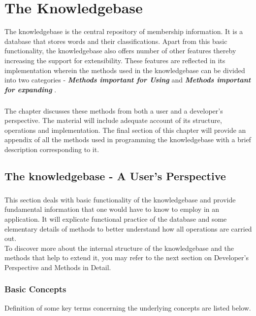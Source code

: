 \chapter{The Knowledgebase}

The knowledgebase is the central repository of membership information. It is a database that stores words and their classifications. Apart from this basic functionality, the knowledgebase also offers number of other features thereby increasing the support for extensibility.
These features are reflected in its implementation wherein the methods used in the knowledgebase can be divided into two categories - \textbf{\emph{Methods important for Using \libalf}} and \textbf{\emph{Methods important for expanding \libalf}}. 
\paragraph{}
The chapter discusses these methods from both a user and a developer's perspective. The material will include adequate account of its structure, operations and implementation.  The final section of this chapter will provide an appendix of all the methods used in programming the knowledgebase with a brief description corresponding to it.  
\vskip 1pt

\section{The knowledgebase - A User's Perspective}

\paragraph{} This section deals with basic functionality of the knowledgebase and provide fundamental information that one would have to know to employ \libalf in an application. It will explicate functional practice of the database and some elementary details of methods to better understand how all operations are carried out. \\
To discover more about the internal structure of the knowledgebase and the methods that help to extend it, you may refer to the next section on Developer's Perspective and Methods in Detail.

\subsection*{Basic Concepts}
	
Definition of some key terms concerning the underlying concepts are listed below.

